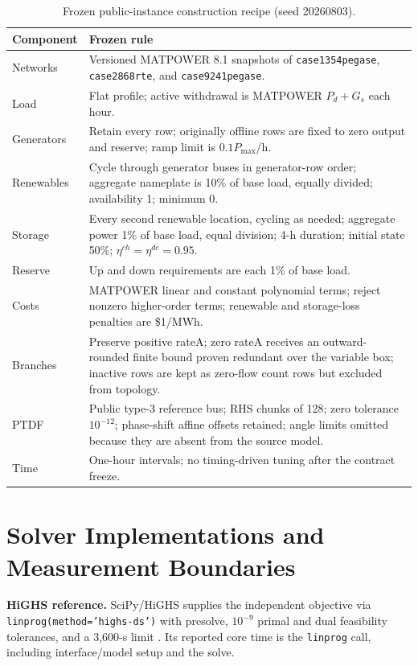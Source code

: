 \documentclass[10pt,journal]{IEEEtran}
\begin{document}
\begin{table}[!t]
\caption{Frozen public-instance construction recipe (seed 20260803).}
\label{tab:recipe}
\centering
\scriptsize
\renewcommand{\arraystretch}{0.92}
\begin{tabular}{@{}lp{}@{}}
\toprule
Component & Frozen rule \\
\midrule
Networks & Versioned MATPOWER 8.1 snapshots of \texttt{case1354pegase},
\texttt{case2868rte}, and \texttt{case9241pegase}. \\
Load & Flat profile; active withdrawal is MATPOWER $P_d+G_s$ each hour. \\
Generators & Retain every row; originally offline rows are fixed to zero
output and reserve; ramp limit is $0.1P_{\max}$/h. \\
Renewables & Cycle through generator buses in generator-row order; aggregate
nameplate is 10\% of base load, equally divided; availability 1; minimum 0. \\
Storage & Every second renewable location, cycling as needed; aggregate power
1\% of base load, equal division; 4-h duration; initial state 50\%;
$\eta^{ch}=\eta^{dc}=0.95$. \\
Reserve & Up and down requirements are each 1\% of base load. \\
Costs & MATPOWER linear and constant polynomial terms; reject nonzero
higher-order terms; renewable and storage-loss penalties are \$1/MWh. \\
Branches & Preserve positive rateA; zero rateA receives an outward-rounded
finite bound proven redundant over the variable box; inactive rows are kept
as zero-flow count rows but excluded from topology. \\
PTDF & Public type-3 reference bus; RHS chunks of 128; zero tolerance
$10^{-12}$; phase-shift affine offsets retained; angle limits omitted because
they are absent from the source model. \\
Time & One-hour intervals; no timing-driven tuning after the contract freeze. \\
\bottomrule
\end{tabular}
\end{table}

\section{Solver Implementations and Measurement Boundaries}
\label{app:solvers}

\textbf{HiGHS reference.} SciPy/HiGHS supplies the independent objective via
\texttt{linprog(method='highs-ds')} with presolve, $10^{-9}$ primal and dual
feasibility tolerances, and a 3,600-s limit \cite{scipy2020,highs2018}. Its
reported core time is the \texttt{linprog} call, including interface/model
setup and the solve.
\end{document}
